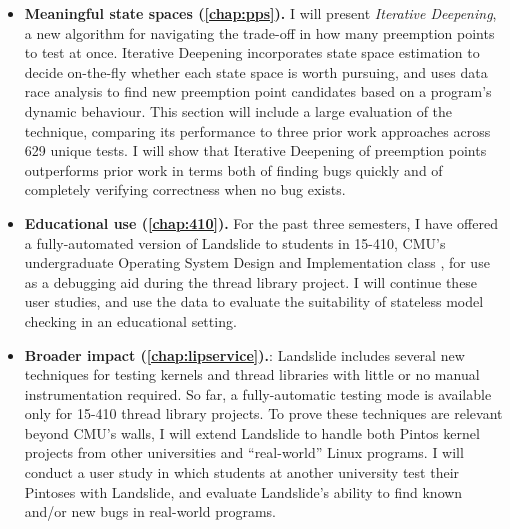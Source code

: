 \documentclass[12pt]{cmuthesis}
\begin{document}
\begin{itemize}
	\item {\bf Meaningful state spaces (\ref{chap:pps}).}
		I will present {\em Iterative Deepening}, a new algorithm for navigating the trade-off in how many preemption points to test at once.
		Iterative Deepening incorporates state space estimation \cite{estimation} to decide on-the-fly whether each state space is worth pursuing, and uses data race analysis \cite{tsan} to find new preemption point candidates based on a program's dynamic behaviour.
		This section will include a large evaluation of the technique, comparing its performance to three prior work approaches across 629 unique tests.
		I will show that Iterative Deepening of preemption points outperforms prior work in terms both of finding bugs quickly and of completely verifying correctness when no bug exists.
	\item {\bf Educational use (\ref{chap:410}).}
		For the past three semesters, I have offered a fully-automated version of Landslide to students in 15-410, CMU's undergraduate Operating System Design and Implementation class \cite{kspec,thrlib}, for use as a debugging aid during the thread library project.
		I will continue these user studies, and use the data to evaluate the suitability of stateless model checking in an educational setting.
	\item {\bf Broader impact (\ref{chap:lipservice}).}:
		Landslide includes several new techniques for testing kernels and thread libraries with little or no manual instrumentation required.
		So far, a fully-automatic testing mode is available only for 15-410 thread library projects.
		To prove these techniques are relevant beyond CMU's walls, I will extend Landslide to handle both Pintos kernel projects from other universities \cite{pintos} and ``real-world'' Linux programs.
		I will conduct a user study in which students at another university test their Pintoses with Landslide,
		and evaluate Landslide's ability to find known and/or new bugs in real-world programs.
\end{itemize}

\end{document}
